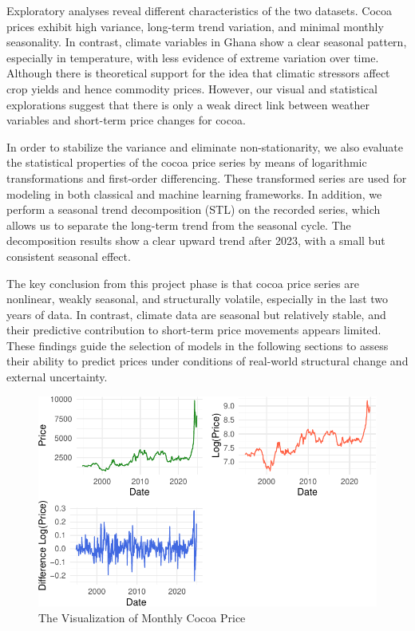 \documentclass[
  letterpaper,
  DIV=11,
  numbers=noendperiod]{scrartcl}
\begin{document}
Exploratory analyses reveal different characteristics of the two
datasets. Cocoa prices exhibit high variance, long-term trend variation,
and minimal monthly seasonality. In contrast, climate variables in Ghana
show a clear seasonal pattern, especially in temperature, with less
evidence of extreme variation over time. Although there is theoretical
support for the idea that climatic stressors affect crop yields and
hence commodity prices. However, our visual and statistical explorations
suggest that there is only a weak direct link between weather variables
and short-term price changes for cocoa.

In order to stabilize the variance and eliminate non-stationarity, we
also evaluate the statistical properties of the cocoa price series by
means of logarithmic transformations and first-order differencing. These
transformed series are used for modeling in both classical and machine
learning frameworks. In addition, we perform a seasonal trend
decomposition (STL) on the recorded series, which allows us to separate
the long-term trend from the seasonal cycle. The decomposition results
show a clear upward trend after 2023, with a small but consistent
seasonal effect.

The key conclusion from this project phase is that cocoa price series
are nonlinear, weakly seasonal, and structurally volatile, especially in
the last two years of data. In contrast, climate data are seasonal but
relatively stable, and their predictive contribution to short-term price
movements appears limited. These findings guide the selection of models
in the following sections to assess their ability to predict prices
under conditions of real-world structural change and external
uncertainty.

\begin{figure}

{\centering \includegraphics{STA457_Project_files/figure-pdf/fig-eda-cocoa-price-1.pdf}

}

\caption{\label{fig-eda-cocoa-price}The Visualization of Monthly Cocoa
Price}

\end{figure}
\end{document}
